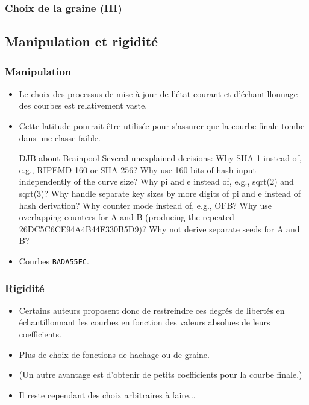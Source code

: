\documentclass[francais]{beamer}
\begin{document}
\begin{frame}\frametitle{Choix de la graine (III)}
\begin{center}
\end{center}
\end{frame}

\subsection{Manipulation et rigidité}

\begin{frame}\frametitle{Manipulation}
\begin{itemize}
\item Le choix des processus de mise à jour de l'état courant et d'échantillonnage des courbes est relativement vaste.
\item Cette latitude pourrait être utilisée pour s'assurer que la courbe finale tombe dans une classe faible.
\begin{block}{DJB about Brainpool}
\small
Several unexplained decisions: Why SHA-1 instead of, e.g., RIPEMD-160 or SHA-256? Why use 160 bits of hash input independently of the curve size? Why pi and e instead of, e.g., sqrt(2) and sqrt(3)? Why handle separate key sizes by more digits of pi and e instead of hash derivation? Why counter mode instead of, e.g., OFB? Why use overlapping counters for A and B (producing the repeated 26DC5C6CE94A4B44F330B5D9)? Why not derive separate seeds for A and B?
\end{block}
\item Courbes \texttt{BADA55EC}.
\end{itemize}
\end{frame}

\begin{frame}\frametitle{Rigidité}
\begin{itemize}
\item Certains auteurs proposent donc de restreindre ces degrés de libertés en échantillonnant les courbes en fonction des valeurs absolues de leurs coefficients.
\item Plus de choix de fonctions de hachage ou de graine.
\item (Un autre avantage est d'obtenir de petits coefficients pour la courbe finale.)
\item Il reste cependant des choix arbitraires à faire...
\end{itemize}
\end{frame}
\end{document}
